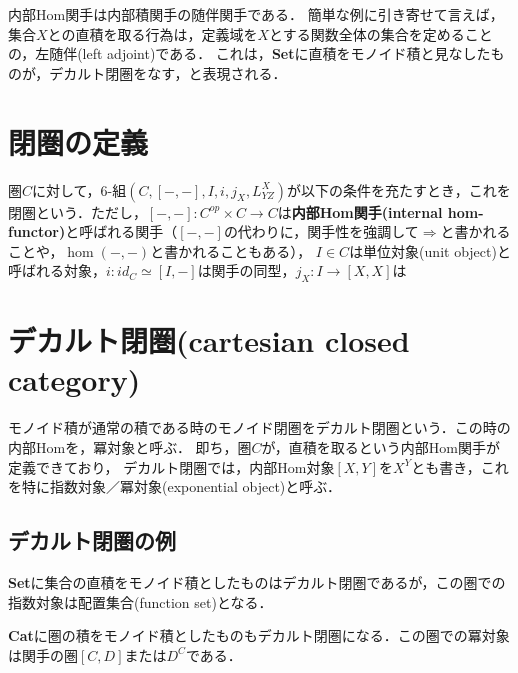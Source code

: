 \documentclass[uplatex, 12pt, dvipdfmx]{jsreport}
\begin{document}
内部Hom関手は内部積関手の随伴関手である．
簡単な例に引き寄せて言えば，集合$X$との直積を取る行為は，定義域を$X$とする関数全体の集合を定めることの，左随伴(left adjoint)である．
これは，\textbf{Set}に直積をモノイド積と見なしたものが，デカルト閉圏をなす，と表現される．

\section{閉圏の定義}

\begin{definition}\label{def-closed-category} \rm{}
    圏$C$に対して，6-組$(C,[-,-],I,i,j_X,L^X_{YZ})$が以下の条件を充たすとき，これを閉圏という．ただし，$[-,-]:C^{op}\times C\to C$は\textbf{内部Hom関手(internal hom-functor)}と呼ばれる関手（$[-,-]$の代わりに，関手性を強調して$\Rightarrow$と書かれることや，$\hom (-,-)$と書かれることもある），
    $I\in C$は単位対象(unit object)と呼ばれる対象，$i:id_C\simeq [I,-]$は関手の同型，$j_X:I\to [X,X]$は
\end{definition}

\section{デカルト閉圏(cartesian closed category)}

モノイド積が通常の積である時のモノイド閉圏をデカルト閉圏という．この時の内部Homを，冪対象と呼ぶ．
即ち，圏$C$が，直積を取るという内部Hom関手が定義できており，
デカルト閉圏では，内部Hom対象$[X,Y]$を$X^Y$とも書き，これを特に指数対象／冪対象(exponential object)と呼ぶ．
\subsection{デカルト閉圏の例}

\textbf{Set}に集合の直積をモノイド積としたものはデカルト閉圏であるが，この圏での指数対象は配置集合(function set)となる．

\textbf{Cat}に圏の積をモノイド積としたものもデカルト閉圏になる．この圏での冪対象は関手の圏$[C,D]$または$D^C$である．
\end{document}
